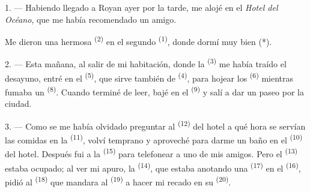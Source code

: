 %


\VUsaut{3.0mm}
\VUsaut{1.6mm}
\VUsaut{2.0mm}
\VUsaut{3.4mm}

1. --- Habiendo llegado a Royan ayer por la tarde, me alojé en el
\textit{Hotel del Océano}, que me había recomendado un amigo.

Me dieron una hermosa  \textsuperscript{(2)} en el segundo
 \textsuperscript{(1)}, donde dormí muy bien (*).

2. --- Esta mañana, al salir de mi habitación, donde la 
\textsuperscript{(3)} me había traído el desayuno, entré en el  \textsuperscript{(5)}, que sirve también de 
\textsuperscript{(4)}, para hojear los  \textsuperscript{(6)} mientras
fumaba un  \textsuperscript{(8)}. Cuando terminé de leer, bajé en
el  \textsuperscript{(9)} y salí a dar un paseo por la ciudad.

3. --- Como se me había olvidado preguntar al 
\textsuperscript{(12)} del hotel a qué hora se servían las comidas en la
 \textsuperscript{(11)}, volví temprano y aproveché para darme
un baño en el  \textsuperscript{(10)} del hotel. Después fui
a la  \textsuperscript{(15)} para telefonear a uno de mis amigos. Pero
el  \textsuperscript{(13)} estaba ocupado; al ver mi apuro, la
 \textsuperscript{(14)}, que estaba anotando una 
\textsuperscript{(17)} en el  \textsuperscript{(16)}, pidió al
 \textsuperscript{(18)} que mandara al 
\textsuperscript{(19)} a hacer mi recado en su  \textsuperscript{(20)}.

